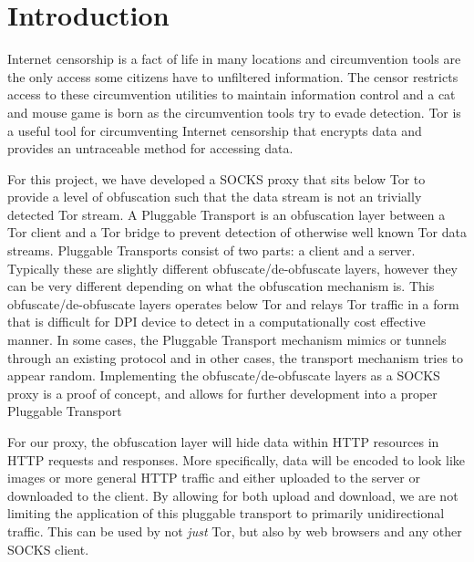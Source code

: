 \section{Introduction}
Internet censorship is a fact of life in many locations and circumvention tools are the only access some citizens have to unfiltered information. The censor restricts access to these circumvention utilities to maintain information control and a cat and mouse game is born as the circumvention tools try to evade detection. Tor is a useful tool for circumventing Internet censorship that encrypts data and provides an untraceable method for accessing data.

For this project, we have developed a SOCKS proxy that sits below Tor to provide a level of obfuscation such that the data stream is not an trivially detected Tor stream. 
A Pluggable Transport is an obfuscation layer between a Tor client and a Tor bridge to prevent detection of otherwise  well known Tor data streams. Pluggable Transports consist of two parts: a client and a server. Typically these are slightly different obfuscate/de-obfuscate layers, however they can be very different depending on what the obfuscation mechanism is. This obfuscate/de-obfuscate layers operates below Tor and relays Tor traffic in a form that is difficult for DPI device to detect in a computationally cost effective manner. In some cases, the Pluggable Transport mechanism mimics or tunnels through an existing protocol\cite{Ref2,Ref3} and in other cases, the transport mechanism tries to appear random\cite{Ref4}. Implementing the obfuscate/de-obfuscate layers as a SOCKS proxy is a proof of concept, and allows for further development into a proper Pluggable Transport

For our proxy, the obfuscation layer will hide data within HTTP resources in HTTP requests and responses. More specifically, data will be encoded to look like images or more general HTTP traffic and either uploaded to the server or downloaded to the client. By allowing for both upload and download, we are not limiting the application of this pluggable transport to primarily unidirectional traffic. This can be used by not \emph{just} Tor, but also by web browsers and any other SOCKS client.
